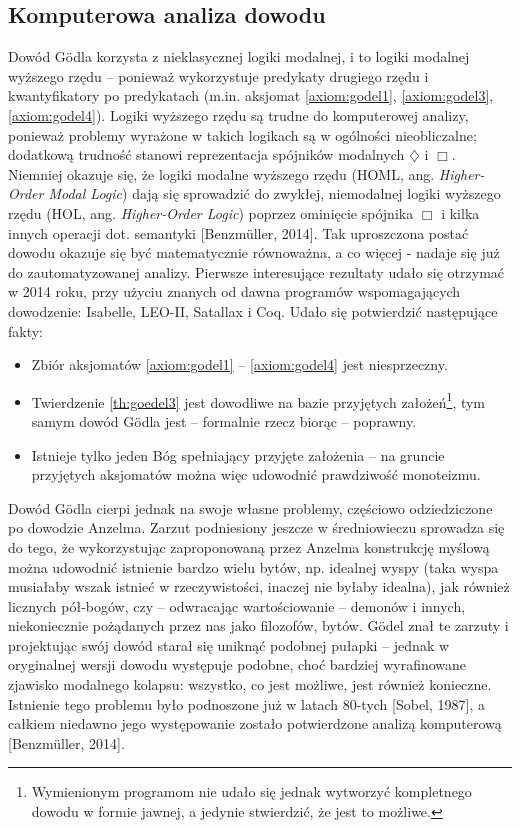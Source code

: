 \documentclass[12pt]{article}
\begin{document}
\begin{multicols}{2}
\section{Komputerowa analiza dowodu}
Dowód G\"odla korzysta z nieklasycznej logiki modalnej, i to logiki modalnej wyższego rzędu -- ponieważ wykorzystuje predykaty drugiego rzędu i kwantyfikatory po predykatach (m.in. aksjomat \ref{axiom:godel1}, \ref{axiom:godel3}, \ref{axiom:godel4}). Logiki wyższego rzędu są trudne do komputerowej analizy, ponieważ problemy wyrażone w takich logikach są w ogólności nieobliczalne; dodatkową trudność stanowi reprezentacja spójników modalnych $\diamondsuit$ i $\Box$. Niemniej okazuje się, że logiki modalne wyższego rzędu (HOML, ang. \textit{Higher-Order Modal Logic}) dają się sprowadzić do zwykłej, niemodalnej logiki wyższego rzędu (HOL, ang. \textit{Higher-Order Logic}) poprzez ominięcie spójnika $\Box$ i kilka innych operacji dot. semantyki [Benzm\"uller, 2014]. Tak uproszczona postać dowodu okazuje się być matematycznie równoważna, a co więcej - nadaje się już do zautomatyzowanej analizy. Pierwsze interesujące rezultaty udało się otrzymać w 2014 roku, przy użyciu znanych od dawna programów wspomagających dowodzenie: Isabelle, LEO-II, Satallax i Coq. Udało się potwierdzić następujące fakty:
\begin{itemize}
	\item Zbiór aksjomatów \ref{axiom:godel1} -- \ref{axiom:godel4} jest niesprzeczny. 
	\item Twierdzenie \ref{th:goedel3} jest dowodliwe na bazie przyjętych założeń\footnote{Wymienionym programom nie udało się jednak wytworzyć kompletnego dowodu w formie jawnej, a jedynie stwierdzić, że jest to możliwe. }, tym samym dowód G\"odla jest -- formalnie rzecz biorąc -- poprawny.
	\item Istnieje tylko jeden Bóg spełniający przyjęte założenia -- na  gruncie przyjętych aksjomatów można więc udowodnić prawdziwość monoteizmu. 
\end{itemize}

Dowód G\"odla cierpi jednak na swoje własne problemy, częściowo odziedziczone po dowodzie Anzelma. Zarzut podniesiony jeszcze w średniowieczu sprowadza się do tego, że wykorzystując zaproponowaną przez Anzelma konstrukcję myślową można udowodnić istnienie bardzo wielu bytów, np. idealnej wyspy (taka wyspa musiałaby wszak istnieć w rzeczywistości, inaczej nie byłaby idealna), jak również licznych pół-bogów, czy -- odwracając wartościowanie -- demonów i innych, niekoniecznie pożądanych przez nas jako filozofów, bytów. G\"odel znał te zarzuty i projektując swój dowód starał się uniknąć podobnej pułapki -- jednak w oryginalnej wersji dowodu występuje podobne, choć bardziej wyrafinowane zjawisko modalnego kolapsu: wszystko, co jest możliwe, jest również konieczne. Istnienie tego problemu było podnoszone już w latach 80-tych [Sobel, 1987], a całkiem niedawno jego występowanie zostało potwierdzone analizą komputerową [Benzm\"uller, 2014]. 


\end{multicols}
\end{document}
